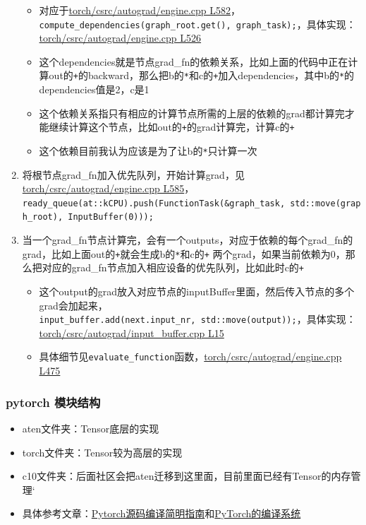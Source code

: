 \begin{enumerate}
  \begin{itemize}
  \tightlist
  \item
    对应于\href{https://github.com/pytorch/pytorch/blob/master/torch/csrc/autograd/engine.cpp\#L582}{torch/csrc/autograd/engine.cpp
    L582}，\texttt{compute\_dependencies(graph\_root.get(),\ graph\_task);}，具体实现：\href{https://github.com/pytorch/pytorch/blob/master/torch/csrc/autograd/engine.cpp\#L526}{torch/csrc/autograd/engine.cpp
    L526}
  \item
    这个dependencies就是节点grad\_fn的依赖关系，比如上面的代码中正在计算out的\texttt{+}的backward，那么把b的\texttt{*}和c的\texttt{+}加入dependencies，其中b的\texttt{*}的dependencies值是2，c是1
  \item
    这个依赖关系指只有相应的计算节点所需的上层的依赖的grad都计算完才能继续计算这个节点，比如out的\texttt{+}的grad计算完，计算c的\texttt{+}
  \item
    这个依赖目前我认为应该是为了让b的\texttt{*}只计算一次
  \end{itemize}
\item
  将根节点grad\_fn加入优先队列，开始计算grad，见\href{https://github.com/pytorch/pytorch/blob/master/torch/csrc/autograd/engine.cpp\#L586}{torch/csrc/autograd/engine.cpp
  L585}，\texttt{ready\_queue(at::kCPU).push(FunctionTask(\&graph\_task,\ std::move(graph\_root),\ InputBuffer(0)));}
\item
  当一个grad\_fn节点计算完，会有一个outputs，对应于依赖的每个grad\_fn的grad，比如上面out的\texttt{+}就会生成b的\texttt{*}和c的\texttt{+}
  两个grad，如果当前依赖为0，那么把对应的grad\_fn节点加入相应设备的优先队列，比如此时c的\texttt{+}

  \begin{itemize}
  \tightlist
  \item
    这个output的grad放入对应节点的inputBuffer里面，然后传入节点的多个grad会加起来，\texttt{input\_buffer.add(next.input\_nr,\ std::move(output));}，具体实现：\href{https://github.com/pytorch/pytorch/blob/master/torch/csrc/autograd/input_buffer.cpp\#L15}{torch/csrc/autograd/input\_buffer.cpp
    L15}
  \item
    具体细节见\texttt{evaluate\_function}函数，\href{https://github.com/pytorch/pytorch/blob/master/torch/csrc/autograd/engine.cpp\#L475}{torch/csrc/autograd/engine.cpp
    L475}
  \end{itemize}
\end{enumerate}

\subsubsection{pytorch 模块结构}

\begin{itemize}
\tightlist
\item
  aten文件夹：Tensor底层的实现
\item
  torch文件夹：Tensor较为高层的实现
\item
  c10文件夹：后面社区会把aten迁移到这里面，目前里面已经有Tensor的内存管理`
\item
  具体参考文章：\href{https://oldpan.me/archives/pytorch-build-simple-instruction}{Pytorch源码编译简明指南}和\href{https://zhuanlan.zhihu.com/p/55204134}{PyTorch的编译系统}
\end{itemize}
